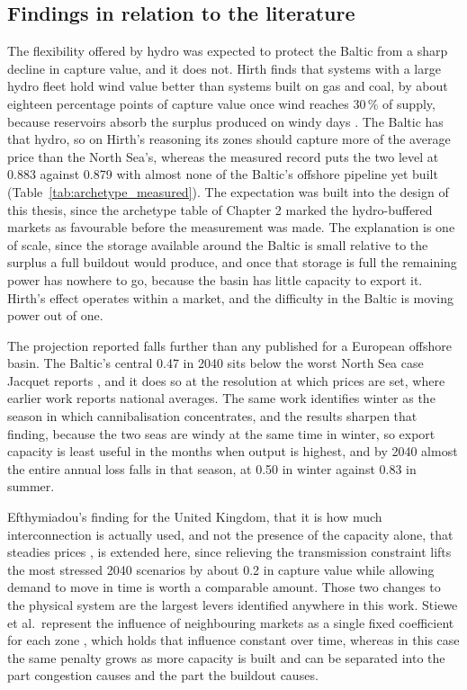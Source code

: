 \subsection{Findings in relation to the literature}\label{sec:disc_literature}

The flexibility offered by hydro was expected to protect the Baltic from a sharp
decline in capture value, and it does not. Hirth finds that systems with a large
hydro fleet hold wind value better than systems built on gas and coal, by about
eighteen percentage points of capture value once wind reaches 30\,\% of supply,
because reservoirs absorb the surplus produced on windy days \cite{Hirth2013}.
The Baltic has that hydro, so on Hirth's reasoning its zones should capture more
of the average price than the North Sea's, whereas the measured record puts the
two level at 0.883 against 0.879 with almost none of the Baltic's offshore
pipeline yet built (Table~\ref{tab:archetype_measured}). The
expectation was built into the design of this thesis, since the archetype table
of Chapter 2 marked the hydro-buffered markets as favourable before the
measurement was made. The explanation is one of scale, since the storage available around the Baltic is small relative to the
surplus a full buildout would produce, and once that storage is full the
remaining power has nowhere to go, because the basin has little capacity to
export it. Hirth's effect operates within a market, and the difficulty in the
Baltic is moving power out of one.

The projection reported falls further than any published for a European
offshore basin. The Baltic's central 0.47 in 2040 sits below the worst North Sea
case Jacquet reports \cite{Jacquet2024}, and it does so at the resolution at
which prices are set, where earlier work reports national averages. The same work
identifies winter as the season in which cannibalisation concentrates, and the
results sharpen that finding, because the two seas are windy at the same
time in winter, so export capacity is least useful in the months when output is
highest, and by 2040 almost the entire annual loss falls in that season, at 0.50
in winter against 0.83 in summer.

Efthymiadou's finding for the United Kingdom, that it is how much
interconnection is actually used, and not the presence of the capacity alone,
that steadies prices \cite{Efthymiadou2025}, is extended here, since relieving the transmission constraint
lifts the most stressed 2040 scenarios by about 0.2 in capture value while
allowing demand to move in time is worth a comparable amount. Those two changes
to the physical system are the largest levers identified anywhere in this work.
Stiewe et al.\ represent the influence of neighbouring markets as a single fixed
coefficient for each zone \cite{Stiewe2025}, which holds that influence constant
over time, whereas in this case the same penalty grows as more capacity is built and can
be separated into the part congestion causes and the part the buildout causes.

